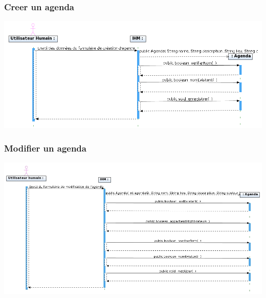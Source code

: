 \documentclass[12pt , a4paper]{article}
\begin{document}
\begin{landscape}
\subsubsection{Creer un agenda}
\begin{center}
  \includegraphics[scale=0.55]{./images/diag_seq_creer_agenda.png}
\end{center}
\end{landscape}

\begin{landscape}
\subsubsection{Modifier un agenda}
\begin{center}
  \includegraphics[scale=0.55]{./images/diag_seq_modifier_agenda.jpg}
\end{center}
\end{landscape}
\end{document}
